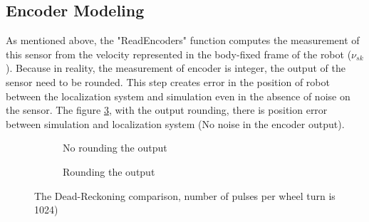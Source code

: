 \documentclass[letterpaper,12pt]{article}
\begin{document}
\subsection{Encoder Modeling}
As mentioned above, the "ReadEncoders" function computes the measurement of this sensor from the velocity represented in the body-fixed frame of the robot ($\nu_{sk}$). Because in reality, the measurement of encoder is integer, the output of the sensor need to be rounded. This step creates error in the position of robot between the localization system and simulation even in the absence of noise on the sensor. The figure \ref{fig:map4_1}, with the output rounding, there is position error between simulation and localization system (No noise in the encoder output).

\begin{figure}[H]
    \centering
    \begin{subfigure}[b]{8.cm}
        \centering
        \captionsetup{justification=centering}
        \caption{No rounding the output}
        \label{fig:kermit}
    \end{subfigure}
    \begin{subfigure}[b]{8.cm}
        \centering
        \captionsetup{justification=centering}
        \caption{Rounding the output}
        \label{fig:rana}
    \end{subfigure}
\caption{The Dead-Reckoning comparison, number of pulses per wheel turn is 1024)}
\label{fig:map4_1}
\end{figure}
\end{document}
